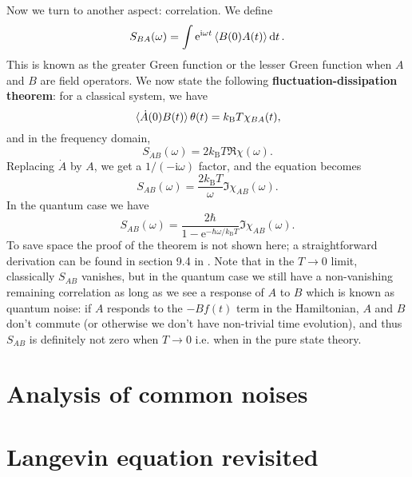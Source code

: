 \documentclass[hyperref, a4paper]{article}
\newcommand*{\ii}{\mathrm{i}}
\newcommand*{\ee}{\mathrm{e}}
\newcommand*{\concept}[1]{{\textbf{#1}}}
\newcommand*{\kB}{k_{\text{B}}}
\begin{document}
Now we turn to another aspect: correlation.
We define 
\begin{equation}
    S_{BA}(\omega) = \int \ee^{\ii \omega t} \expval{B(0) A(t)} \dd{t}.
\end{equation}
This is known as the greater Green function or the lesser Green function 
when $A$ and $B$ are field operators.
We now state the following \concept{fluctuation-dissipation theorem}:
for a classical system, we have 
\begin{equation}
    \expval*{\dot{A}(0) B(t)} \theta(t) = \kB T \chi_{BA}(t),
\end{equation}
and in the frequency domain, 
\begin{equation}
    S_{\dot{A} B} (\omega) = 2 \kB T \Re \chi(\omega).
\end{equation}
Replacing $\dot{A}$ by $A$, we get a $1 / (- \ii \omega)$ factor,
and the equation becomes 
\begin{equation}
    S_{AB}(\omega) = \frac{2 \kB T}{\omega} \Im \chi_{AB}(\omega).
\end{equation}
In the quantum case we have 
\begin{equation}
    S_{AB}(\omega) = \frac{2\hbar}{1 - \ee^{- \hbar \omega / \kB T}} \Im \chi_{AB}(\omega).
\end{equation}
To save space the proof of the theorem is not shown here; 
a straightforward derivation can be found in section 9.4 in \cite{coleman2015introduction}.
Note that in the $T \to 0$ limit, 
classically $S_{AB}$ vanishes,
but in the quantum case we still have a non-vanishing remaining correlation
as long as we see a response of $A$ to $B$
which is known as quantum noise:
if $A$ responds to the $- B f(t)$ term in the Hamiltonian,
$A$ and $B$ don't commute (or otherwise we don't have non-trivial time evolution),
and thus $S_{AB}$ is definitely not zero when $T \to 0$
i.e. when in the pure state theory.

\section{Analysis of common noises}

\section{Langevin equation revisited}
\end{document}
